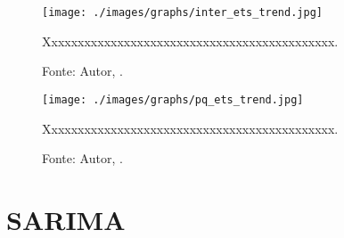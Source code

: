 
\lipsum[100]




\begin{figure}[H]
    \centering
    \texttt{[image: ./images/graphs/inter\_ets\_trend.jpg]}
    \caption{Xxxxxxxxxxxxxxxxxxxxxxxxxxxxxxxxxxxxxxxxxxxx.}
    \label{fig:inter_ets_trend.jpg}
    \caption*{Fonte: Autor, \imprimirdata.}
\end{figure}




\lipsum[100]




\begin{figure}[H]
    \centering
    \texttt{[image: ./images/graphs/pq\_ets\_trend.jpg]}
    \caption{Xxxxxxxxxxxxxxxxxxxxxxxxxxxxxxxxxxxxxxxxxxxx.}
    \label{fig:pq_ets_trend.jpg}
    \caption*{Fonte: Autor, \imprimirdata.}
\end{figure}




\lipsum[100]



\chapter{SARIMA}



